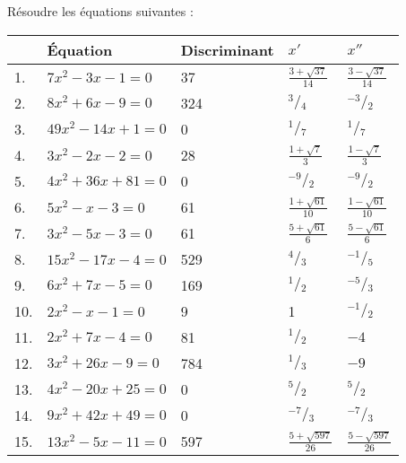 \begin{solution}
Résoudre les équations suivantes :

\begin{tabular}{|l|l|l|l|l|}
\hline
	&Équation	&Discriminant &	${x}'$	& ${x}''$\\
\hline
1.	&$7{{x}^{2}}-3x-1=0$	&37&	$\frac{3+\sqrt{37}}{14}$	&$\frac{3-\sqrt{37}}{14}$\\
\hline
2.	&$8{{x}^{2}}+6x-9=0$	&324&	${}^{3}/{}_{4}$	&${}^{-3}/{}_{2}$\\
\hline
3.	&$49{{x}^{2}}-14x+1=0$	&0&	${}^{1}/{}_{7}$	&${}^{1}/{}_{7}$\\
\hline
4.	&$3{{x}^{2}}-2x-2=0$	&28&	$\frac{1+\sqrt{7}}{3}$	&$\frac{1-\sqrt{7}}{3}$\\
\hline
5.	&$4{{x}^{2}}+36x+81=0$	&0&	${}^{-9}/{}_{2}$	&${}^{-9}/{}_{2}$\\
\hline
6.	&$5{{x}^{2}}-x-3=0$	&61&	$\frac{1+\sqrt{61}}{10}$	&$\frac{1-\sqrt{61}}{10}$\\
\hline
7.	&$3{{x}^{2}}-5x-3=0$	&61&	$\frac{5+\sqrt{61}}{6}$	&$\frac{5-\sqrt{61}}{6}$\\
\hline
8.	&$15{{x}^{2}}-17x-4=0$	&529&	${}^{4}/{}_{3}$	&${}^{-1}/{}_{5}$\\
\hline
9.	&$6{{x}^{2}}+7x-5=0$	&169&	${}^{1}/{}_{2}$	&${}^{-5}/{}_{3}$\\
\hline
10.	&$2{{x}^{2}}-x-1=0$	&9&	1	&${}^{-1}/{}_{2}$\\
\hline
11.	&$2{{x}^{2}}+7x-4=0$	&81&	${}^{1}/{}_{2}$	&$-4$\\
\hline
12.	&$3{{x}^{2}}+26x-9=0$	&784&	${}^{1}/{}_{3}$	&$-9$\\
\hline
13.	&$4{{x}^{2}}-20x+25=0$	&0&	${}^{5}/{}_{2}$	&${}^{5}/{}_{2}$\\
\hline
14.	&$9{{x}^{2}}+42x+49=0$	&0&	${}^{-7}/{}_{3}$	&${}^{-7}/{}_{3}$\\
\hline
15.	&$13{{x}^{2}}-5x-11=0$	&597&	$\frac{5+\sqrt{597}}{26}$	&$\frac{5-\sqrt{597}}{26}$\\
\hline
\end{tabular}

\end{solution}

